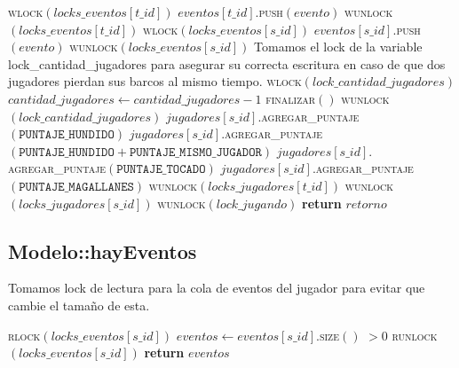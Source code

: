 \documentclass[a4paper,10pt,twoside]{article}
\newenvironment{pseudo}[1][]{%
    \vspace{0.5em}%
    \begin{algorithmic}%
}
{%
    \end{algorithmic}%
    \vspace{0.5em}%
}
\newcommand{\Fn}[2]{\textsc{#1}$(#2)$}
\newcommand{\PReturn}[1]{\textbf{return} $#1$}
\begin{document}
\begin{pseudo}
                \State
                \State \Fn{wlock}{locks\_eventos[t\_id]} 
                \State $eventos[t\_id].$\Fn{push}{evento}
                \State \Fn{wunlock}{locks\_eventos[t\_id]}
                \State
                \State \Fn{wlock}{locks\_eventos[s\_id]} 
                \State $eventos[s\_id].$\Fn{push}{evento}
                \State \Fn{wunlock}{locks\_eventos[s\_id]}
                \State
                    \State 
                    \State Tomamos el lock de la variable lock\_cantidad\_jugadores para asegurar su correcta escritura en caso de que dos jugadores pierdan sus barcos al mismo tiempo.
                    \State 
                    \State \Fn{wlock}{lock\_cantidad\_jugadores}
                    \State $cantidad\_jugadores \leftarrow cantidad\_jugadores - 1$
                        \State \Fn{finalizar}{}
                    \EndIf
                    \State \Fn{wunlock}{lock\_cantidad\_jugadores}
                \EndIf
            \EndIf
                \State $jugadores[s\_id].$\Fn{agregar\_puntaje}{\texttt{PUNTAJE\_HUNDIDO}}
                \State $jugadores[s\_id].$\Fn{agregar\_puntaje}{\texttt{PUNTAJE\_HUNDIDO} + \texttt{PUNTAJE\_MISMO\_JUGADOR}}
                \State $jugadores[s\_id].$\Fn{agregar\_puntaje}{\texttt{PUNTAJE\_TOCADO}}
                \State $jugadores[s\_id].$\Fn{agregar\_puntaje}{\texttt{PUNTAJE\_MAGALLANES}}
            \EndIf
            \State
            \State \Fn{wunlock}{locks\_jugadores[t\_id]}
            \State \Fn{wunlock}{locks\_jugadores[s\_id]}
        \EndIf
        \State
        \State \Fn{wunlock}{lock\_jugando}
        \State
        \State \PReturn{retorno}
    \EndProcedure
\end{pseudo}


\subsection{Modelo::hayEventos}
Tomamos lock de lectura para la cola de eventos del jugador para evitar que cambie el tamaño de esta.
\begin{pseudo}
        \State \Fn{rlock}{locks\_eventos[s\_id]}
        \State $eventos \leftarrow eventos[s\_id]$.\Fn{size}{} $> 0$
        \State \Fn{runlock}{locks\_eventos[s\_id]}
        \State \PReturn{eventos}
    \EndProcedure
\end{pseudo}
\end{document}
